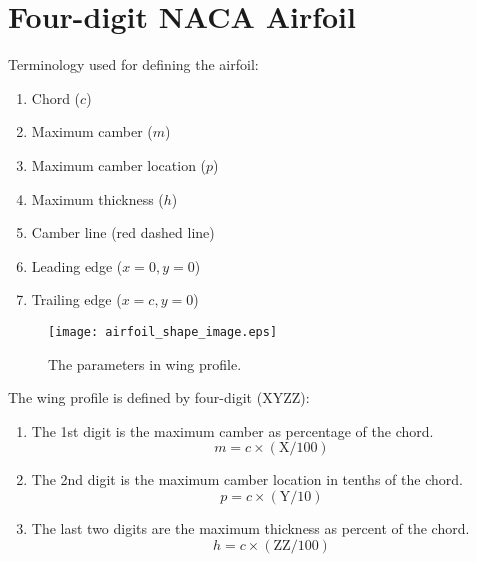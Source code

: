 

\chapter{Four-digit NACA Airfoil}


Terminology used for defining the airfoil:
\begin{enumerate}
    \item
    Chord ($c$)
    \item
    Maximum camber ($m$)
    \item
    Maximum camber location ($p$)
    \item
    Maximum thickness ($h$)
    \item
    Camber line (red dashed line)
    \item
    Leading edge ($x=0, y=0$)
    \item
    Trailing edge ($x=c, y=0$)
\end{enumerate}
\begin{figure}[h!]
    \centering
    \texttt{[image: airfoil\_shape\_image.eps]}
    \caption{The parameters in wing profile.}
    \label{f:airfoil_shape_image}
\end{figure}

The wing profile is defined by four-digit ($\mathrm{XYZZ}$):
\begin{enumerate}
    \item
    The 1st digit is the maximum camber as percentage of the chord.
    \begin{equation*}
        m = c \times (\mathrm{X}/100)
    \end{equation*}
    \item
    The 2nd digit is the maximum camber location in tenths of the chord.
    \begin{equation*}
        p = c \times (\mathrm{Y}/10)
    \end{equation*}
    \item
    The last two digits are the maximum thickness as percent of the chord.
    \begin{equation*}
        h = c \times (\mathrm{ZZ}/100)
    \end{equation*}
\end{enumerate}

